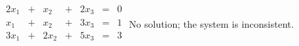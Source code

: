 {$\begin{array}{ccccccc}
2x_1&+&x_2&+&2x_3&=&0\\
x_1&+&x_2&+&3x_3&=&1\\
3x_1&+&2x_2&+&5x_3&=&3\\
\end{array}$}
{No solution; the system is inconsistent.}